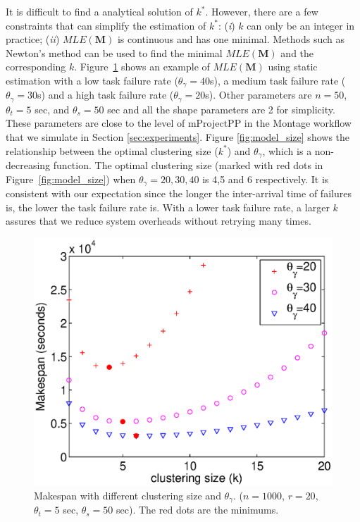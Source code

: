 \documentclass{IOS-Book-Article}
\begin{document}
It is difficult to find a analytical solution of $k^*$. However, there are a few constraints that can simplify the estimation of $k^*$: (\emph{i}) $k$ can only be an integer in practice; (\emph{ii}) $MLE(\bm{M})$ is continuous and has one minimal. Methods such as Newton's method can be used to find the minimal $MLE(\bm{M})$ and the corresponding $k$. Figure~\ref{fig:model_makespan} shows an example of $MLE(\bm{M})$ using static estimation with a low task failure rate ($\theta_{\gamma}=40$s), a medium task failure rate ($\theta_{\gamma}=30$s) and a high task failure rate ($\theta_{\gamma}=20$s). Other parameters are $n=50$, $\theta_{t}=5$ sec, and $\theta_{s}=50$ sec and all the shape parameters are 2 for simplicity. These parameters are close to the level of mProjectPP in the Montage workflow that we simulate in Section \ref{sec:experiments}. 
Figure \ref{fig:model_size} shows the relationship between the optimal clustering size ($k^*$) and $\theta_{\gamma}$, which is a non-decreasing function. The optimal clustering size (marked with red dots in Figure~\ref{fig:model_size}) when $\theta_{\gamma}=20,30,40$ is 4,5 and 6 respectively. 
 It is consistent with our expectation since the longer the inter-arrival time of failures is, the lower the task failure rate is. With a lower task failure rate, a larger $k$ assures that we reduce system overheads without retrying many times.  



\begin{figure}[!htb]
\centering
  \includegraphics[width=0.75\linewidth]{model_makespan.eps}
  \caption{Makespan with different clustering size and $\theta_{\gamma}$. ($n=1000$, $r=20$, $\theta_t=5$ sec, $\theta_s=50$ sec). The red dots are the minimums. }
  \label{fig:model_makespan}
\end{figure}
\end{document}
